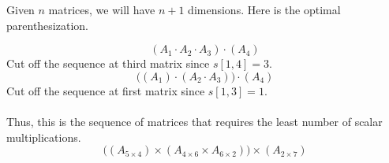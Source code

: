 \documentclass{article}
\begin{document}
Given $n$ matrices, we will have $n+1$ dimensions. Here is the optimal parenthesization.

\begin{equation*}
    (A_1 \cdot A_2 \cdot A_3) \cdot (A_4)
\end{equation*}
Cut off the sequence at third matrix since $s[1, 4] = 3$. \\
\begin{equation*}
    \big((A_1) \cdot (A_2 \cdot A_3)\big) \cdot (A_4)
\end{equation*}
Cut off the sequence at first matrix since $s[1, 3] = 1$.
\\ \\
Thus, this is the sequence of matrices that requires the least number of scalar multiplications.
\begin{equation*}
    \big((A_{5\times4}) \times (A_{4\times6} \times A_{6\times2})\big) \times (A_{2\times7})
\end{equation*}
\end{document}
